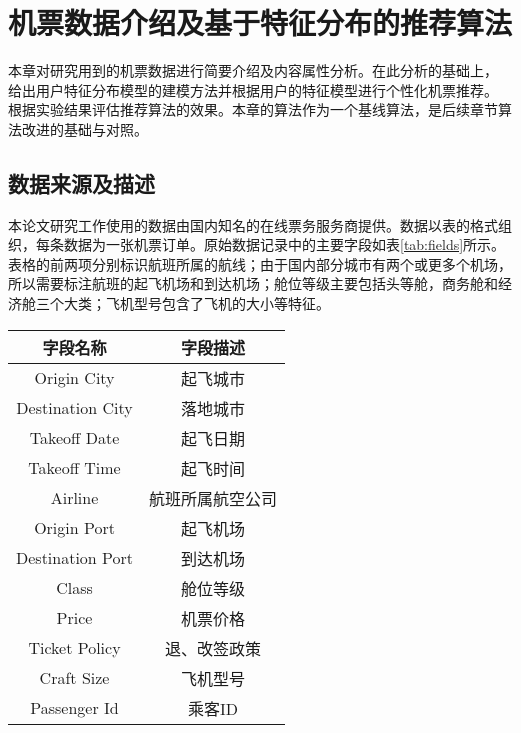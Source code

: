 
\chapter{机票数据介绍及基于特征分布的推荐算法}
\label{chap:baseline}
本章对研究用到的机票数据进行简要介绍及内容属性分析。在此分析的基础上，
给出用户特征分布模型的建模方法并根据用户的特征模型进行个性化机票推荐。
根据实验结果评估推荐算法的效果。本章的算法作为一个基线算法，是后续章节算法改进的基础与对照。

\section{数据来源及描述}

本论文研究工作使用的数据由国内知名的在线票务服务商提供。数据以表的格式组织，每条数据为一张机票订单。原始数据记录中的主要字段如表\ref{tab:fields}所示。
表格的前两项分别标识航班所属的航线；由于国内部分城市有两个或更多个机场，所以需要标注航班的起飞机场和到达机场；舱位等级主要包括头等舱，商务舱和经济舱三个大类；飞机型号包含了飞机的大小等特征。
\begin{table}[!h]
  \centering
  \begin{tabular}{|c|c|} \hline 
    字段名称 & 字段描述\\ \hline
    Origin City & 起飞城市 \\ \hline
    Destination City & 落地城市 \\ \hline
    Takeoff Date & 起飞日期 \\ \hline
    Takeoff Time & 起飞时间 \\ \hline
    Airline & 航班所属航空公司 \\ \hline
    Origin Port & 起飞机场 \\ \hline
    Destination Port & 到达机场 \\ \hline
    Class & 舱位等级 \\ \hline
    Price & 机票价格 \\ \hline
    Ticket Policy & 退、改签政策 \\ \hline
    Craft Size & 飞机型号 \\ \hline
    Passenger Id & 乘客ID \\ \hline
  \end{tabular}
\end{table}

